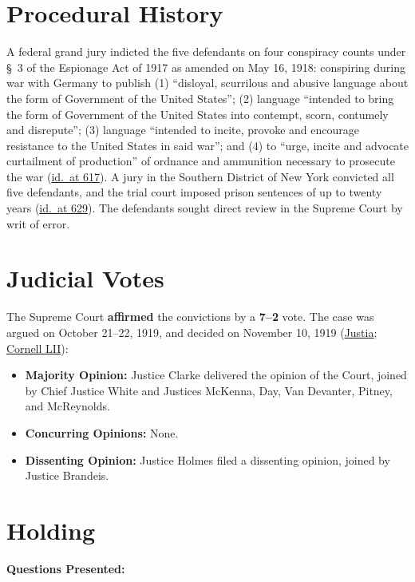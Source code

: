 \documentclass[12pt]{article}
\begin{document}
\section{Procedural History}
A federal grand jury indicted the five defendants on four conspiracy counts under \S~3 of the Espionage Act of 1917 as amended on May 16, 1918: conspiring during war with Germany to publish (1) ``disloyal, scurrilous and abusive language about the form of Government of the United States''; (2) language ``intended to bring the form of Government of the United States into contempt, scorn, contumely and disrepute''; (3) language ``intended to incite, provoke and encourage resistance to the United States in said war''; and (4) to ``urge, incite and advocate curtailment of production'' of ordnance and ammunition necessary to prosecute the war (\href{https://supreme.justia.com/cases/federal/us/250/616/}{id.\ at 617}). A jury in the Southern District of New York convicted all five defendants, and the trial court imposed prison sentences of up to twenty years (\href{https://supreme.justia.com/cases/federal/us/250/616/}{id.\ at 629}). The defendants sought direct review in the Supreme Court by writ of error.

\section{Judicial Votes}
The Supreme Court \textbf{affirmed} the convictions by a \textbf{7--2} vote. The case was argued on October 21--22, 1919, and decided on November 10, 1919 (\href{https://supreme.justia.com/cases/federal/us/250/616/}{Justia}; \href{https://www.law.cornell.edu/supremecourt/text/250/616}{Cornell LII}):

\begin{itemize}
    \item \textbf{Majority Opinion:} Justice Clarke delivered the opinion of the Court, joined by Chief Justice White and Justices McKenna, Day, Van Devanter, Pitney, and McReynolds.
    \item \textbf{Concurring Opinions:} None.
    \item \textbf{Dissenting Opinion:} Justice Holmes filed a dissenting opinion, joined by Justice Brandeis.
\end{itemize}

\section{Holding}
\textbf{Questions Presented:}
\end{document}
